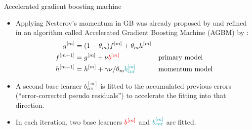 \documentclass[t,10pt]{beamer}
\begin{document}
\begin{frame}{Accelerated gradient boosting machine}
  \begin{itemize}
    \item
      Applying Nesterov's momentum in GB was already proposed by \cite{biau2019accelerated} and refined in an algorithm called Accelerated Gradient Boosting Machine (AGBM) by \cite{lu2020accelerating}:
      \begin{alignat*}{2}
      g^{[m]} &= (1 - \theta_m) f^{[m]} + \theta_m h^{[m]} &&\\
      f^{[m+1]} &= g^{[m]} + \nu {\color{red}b^{[m]}} &&\text{primary model}\\
      h^{[m+1]} &= h^{[m]} + \gamma\nu / \theta_m {\color{blue}b^{[m]}_{\text{cor}}}&&\text{momentum model}
      \end{alignat*}
    \item A {\color{blue}second base learner $b^{[m]}_{\text{cor}}$} is fitted to the accumulated previous errors (\enquote{error-corrected pseudo residuals}) to accelerate the fitting into that direction.
    \item In each iteration, two base learners ${\color{red}b^{[m]}}$ and ${\color{blue}b^{[m]}_{\text{cor}}}$ are fitted.
  \end{itemize}
  \addtocounter{framenumber}{-1}
\end{frame}
\end{document}
